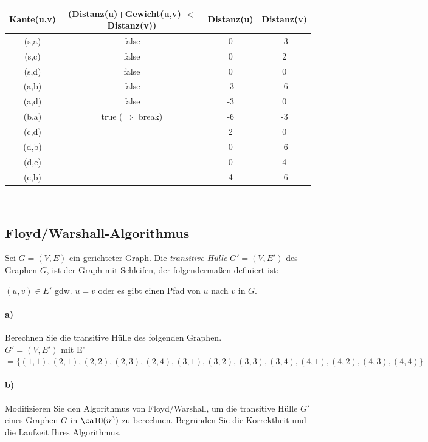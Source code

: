 \documentclass[paper=a4, fontsize=11pt]{scrartcl}
\numberwithin{equation}{section}
\numberwithin{figure}{section}
\numberwithin{table}{section}
\begin{document}
\begin{tabular}{|c||c|c|c|}
\hline
Kante(u,v) & (Distanz(u)+Gewicht(u,v) $<$ Distanz(v)) & Distanz(u) & Distanz(v) \\
\hline \hline
(s,a) & false & 0 & -3 \\\hline
(s,c) & false & 0 & 2 \\\hline
(s,d) & false & 0 & 0 \\\hline
(a,b) & false & -3 & -6 \\\hline
(a,d) & false & -3 & 0 \\\hline
(b,a) & true ($\Rightarrow$ break) & -6 & -3 \\\hline
(c,d) &  & 2 & 0 \\\hline
(d,b) &  & 0 & -6 \\\hline
(d,e) &  & 0 & 4 \\\hline
(e,b) &  & 4 & -6 \\\hline
\end{tabular} \\


\subsection{Floyd/Warshall-Algorithmus}
Sei $G=(V,E)$ ein gerichteter Graph. Die \emph{transitive Hülle} $G'=(V,E')$ des
Graphen $G$, ist der Graph mit Schleifen, der folgendermaßen definiert ist:

\begin{center}
$(u,v)\in E'$ gdw. $u=v$ oder es gibt einen Pfad von $u$ nach $v$ in $G$.
\end{center}

\paragraph{a)}
Berechnen Sie die transitive Hülle des folgenden Graphen. \\

$G' = (V,E')$ mit E' \\
$= \{(1,1),(2,1),(2,2),(2,3),(2,4),(3,1),(3,2),(3,3),(3,4),(4,1),(4,2),(4,3),(4,4) \}$

\paragraph{b)}
Modifizieren Sie den Algorithmus von Floyd/Warshall, um die transitive Hülle $G'$ eines Graphen $G$ in $\calO(n^3)$ zu berechnen. Begründen Sie die Korrektheit und die Laufzeit Ihres Algorithmus.
\end{document}
